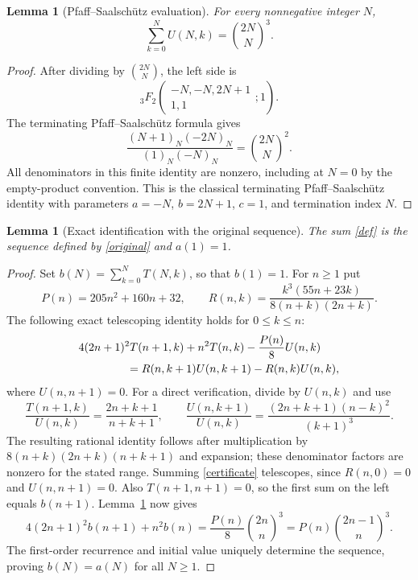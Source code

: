 \documentclass[11pt,a4paper]{article}
\newtheorem{lemma}[theorem]{Lemma}
\numberwithin{equation}{section}
\begin{document}
\begin{lemma}[Pfaff--Saalsch\"utz evaluation]\label{total}
For every nonnegative integer $N$,
\[
 \sum_{k=0}^N U(N,k)=\binom{2N}{N}^{\!3}.
\]
\end{lemma}
\begin{proof}
After dividing by $\binom{2N}{N}$, the left side is
\[
 {}_3F_2\!\left(\begin{matrix}-N,-N,2N+1\\1,1\end{matrix};1\right).
\]
The terminating Pfaff--Saalsch\"utz formula gives
\[
 \frac{(N+1)_N(-2N)_N}{(1)_N(-N)_N}
 =\binom{2N}{N}^{\!2}.
\]
All denominators in this finite identity are nonzero, including at
$N=0$ by the empty-product convention. This is the classical terminating
Pfaff--Saalsch\"utz identity \cite[Eq.~16.4.3]{DLMF} with parameters
$a=-N$, $b=2N+1$, $c=1$, and termination index $N$.
\end{proof}

\begin{lemma}[Exact identification with the original sequence]\label{identify}
The sum \eqref{def} is the sequence defined by \eqref{original} and $a(1)=1$.
\end{lemma}
\begin{proof}
Set $b(N)=\sum_{k=0}^NT(N,k)$, so that $b(1)=1$. For $n\ge1$ put
\[
P(n)=205n^2+160n+32,\qquad
R(n,k)=\frac{k^3(55n+23k)}{8(n+k)(2n+k)}.
\]
The following exact telescoping identity holds for $0\le k\le n$:
\begin{align}
&4(2n+1)^2T(n+1,k)+n^2T(n,k)-\frac{P(n)}8U(n,k)\notag\\
&\hspace{15mm}=R(n,k+1)U(n,k+1)-R(n,k)U(n,k),\label{certificate}
\end{align}
where $U(n,n+1)=0$. For a direct verification, divide by $U(n,k)$ and use
\[
\frac{T(n+1,k)}{U(n,k)}=\frac{2n+k+1}{n+k+1},\qquad
\frac{U(n,k+1)}{U(n,k)}=\frac{(2n+k+1)(n-k)^2}{(k+1)^3}.
\]
The resulting rational identity follows after multiplication by
$8(n+k)(2n+k)(n+k+1)$ and expansion; these denominator factors are
nonzero for the stated range. Summing \eqref{certificate} telescopes,
since $R(n,0)=0$ and $U(n,n+1)=0$. Also $T(n+1,n+1)=0$, so the first sum
on the left equals $b(n+1)$. Lemma~\ref{total} now gives
\[
4(2n+1)^2b(n+1)+n^2b(n)
=\frac{P(n)}8\binom{2n}{n}^{\!3}
=P(n)\binom{2n-1}{n}^{\!3}.
\]
The first-order recurrence and initial value uniquely determine the
sequence, proving $b(N)=a(N)$ for all $N\ge1$.
\end{proof}
\end{document}
